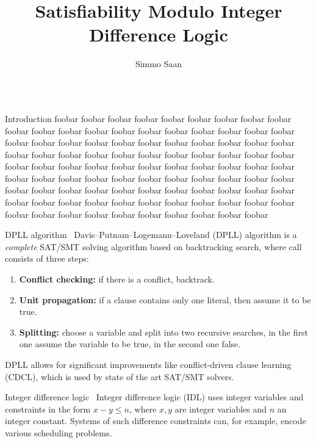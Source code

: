 \documentclass{beamer}
\title{Satisfiability Modulo Integer Difference Logic}
\author{Simmo Saan}
\institute{Institute of Computer Science, University of Tartu}
\date{}
\begin{document}
\nocite{*}

\begin{frame}[fragile,t]
\maketitle

\begin{columns}[t,onlytextwidth]
	\begin{column}{0.485\textwidth}
		\begin{block}{Introduction}
			foobar foobar foobar foobar foobar foobar foobar foobar foobar foobar foobar foobar foobar foobar foobar foobar foobar foobar foobar foobar foobar foobar foobar foobar foobar foobar foobar foobar foobar foobar foobar foobar foobar foobar foobar foobar foobar foobar foobar foobar foobar foobar foobar foobar foobar foobar foobar foobar foobar foobar foobar foobar foobar foobar foobar foobar foobar foobar foobar foobar foobar foobar foobar foobar foobar foobar foobar foobar foobar foobar foobar foobar foobar foobar foobar foobar foobar foobar foobar foobar foobar foobar foobar foobar foobar foobar foobar foobar foobar foobar foobar foobar foobar foobar foobar foobar~\cite{slides}
		\end{block}
	
		\begin{block}{DPLL algorithm~\cite{DPLLmethod}}
			Davis–Putnam–Logemann–Loveland (DPLL) algorithm is a \emph{complete} SAT/SMT solving algorithm based on backtracking search, where call consists of three steps:
			\begin{enumerate}
				\item \textbf{Conflict checking:} if there is a conflict, backtrack.
				\item \textbf{Unit propagation:} if a clause contains only one literal, then assume it to be true.
				\item \textbf{Splitting:} choose a variable and split into two recursive searches, in the first one assume the variable to be true, in the second one false.
			\end{enumerate}
		
			DPLL allows for significant improvements like conflict-driven clause learning (CDCL), which is used by state of the art SAT/SMT solvers.
		\end{block}
	
		\begin{block}{Integer difference logic~\cite{slides}}
			Integer difference logic (IDL) uses integer variables and constraints in the form $x - y \leq n$, where $x, y$ are integer variables and $n$ an integer constant. Systems of such difference constraints can, for example, encode various scheduling problems.
			

\end{block}
\end{column}
\end{columns}
\end{frame}
\end{document}
